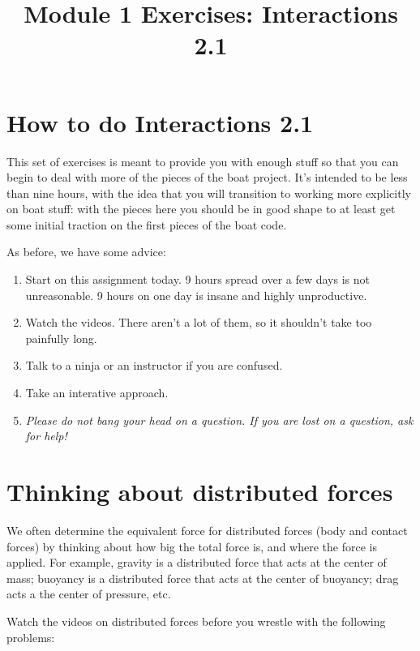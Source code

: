 \documentclass{tufte-handout}
\title{Module 1 Exercises: Interactions 2.1}
\begin{document}
\maketitle

%
%
%
\section{How to do Interactions 2.1}

This set of exercises is meant to provide you with enough stuff so that you can begin to deal with more of the pieces of the boat project. It's intended to be less than nine hours, with the idea that you will transition to working more explicitly on boat stuff: with the pieces here you should be in good shape to at least get some initial traction on the first pieces of the boat code.

As before, we have some advice:\begin{enumerate}
\item Start on this assignment today.  9 hours spread over a few days is not unreasonable.  9 hours on one day is insane and highly unproductive.
\item Watch the videos. There aren't a lot of them, so it shouldn't take too painfully long.
\item Talk to a ninja or an instructor if you are confused.
\item Take an interative approach.
\item {\it Please do not bang your head on a question.  If you are lost on a question, ask for help!}
\end{enumerate}

\clearpage

\section{Thinking about distributed forces}

We often determine the equivalent force for distributed forces (body and contact forces) by thinking about how big the total force is, and where the force is applied.  For example, gravity is a distributed force that acts at the center of mass; buoyancy is a distributed force that acts at the center of buoyancy; drag acts a the center of pressure, etc.  

Watch the videos on distributed forces before you wrestle with the following problems:
\end{document}
